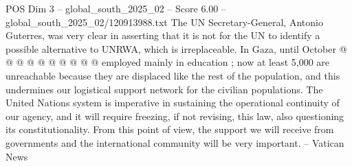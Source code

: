 \begin{textsample}{POS Dim 3 – global\_south\_2025\_02 – Score 6.00 – global\_south\_2025\_02/120913988.txt}
The UN Secretary-General, Antonio Guterres, was very clear in asserting that it is not for the UN to identify a possible alternative to UNRWA, which is irreplaceable.
In Gaza, until October @ @ @ @ @ @ @ @ @ @ employed mainly in education ; now at least 5,000 are unreachable because they are displaced like the rest of the population, and this undermines our logistical support network for the civilian populations.
The United Nations system is imperative in sustaining the operational continuity of our agency, and it will require freezing, if not revising, this law, also questioning its constitutionality.
From this point of view, the support we will receive from governments and the international community will be very important. -- Vatican News

\end{textsample}
